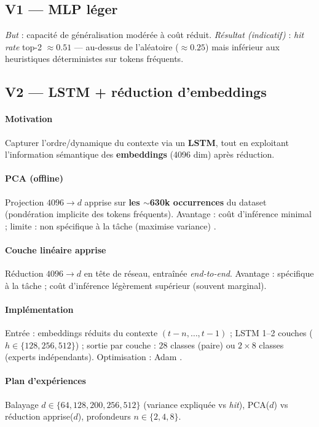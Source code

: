 \documentclass{article}
\begin{document}
\subsection{V1 — MLP léger}
\textit{But} : capacité de généralisation modérée à coût réduit. \textit{Résultat (indicatif)} : \emph{hit rate} top-2 $\approx 0.51$ — au-dessus de l’aléatoire ($\approx 0.25$) mais inférieur aux heuristiques déterministes sur tokens fréquents.

\subsection{V2 — LSTM + réduction d’embeddings}
\paragraph{Motivation} Capturer l’ordre/dynamique du contexte via un \textbf{LSTM}, tout en exploitant l’information sémantique des \textbf{embeddings} (4096 dim) après réduction.
\paragraph{PCA (offline)} Projection $4096\to d$ apprise sur \textbf{les $\sim$630k occurrences} du dataset (pondération implicite des tokens fréquents). Avantage : coût d’inférence minimal ; limite : non spécifique à la tâche (maximise variance) \parencite{Shlens2014}.
\paragraph{Couche linéaire apprise} Réduction $4096\to d$ en tête de réseau, entraînée \emph{end-to-end}. Avantage : spécifique à la tâche ; coût d’inférence légèrement supérieur (souvent marginal).
\paragraph{Implémentation} Entrée : embeddings réduits du contexte $(t\!-\!n,\dots,t\!-\!1)$ ; LSTM 1–2 couches ($h\in\{128,256,512\}$) ; sortie par couche : $28$ classes (paire) ou $2\times 8$ classes (experts indépendants). Optimisation : Adam \parencite{Kingma2014}.
\paragraph{Plan d’expériences} Balayage $d\in\{64,128,200,256,512\}$ (variance expliquée vs \emph{hit}), PCA($d$) vs réduction apprise($d$), profondeurs $n\in\{2,4,8\}$.
\end{document}
